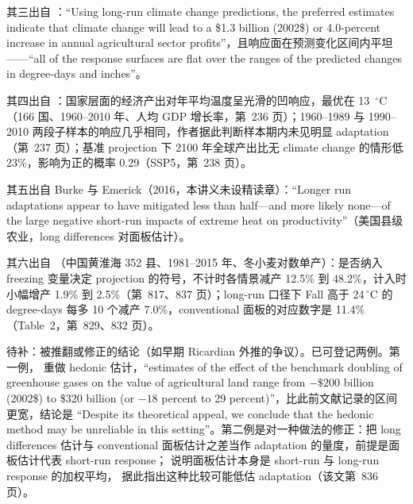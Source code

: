 其三出自 ：``Using long-run climate change predictions, the preferred estimates indicate that climate change will lead to a \$1.3 billion (2002\$) or 4.0-percent increase in annual agricultural sector profits''\citep[第~356 页，AER 97(1) 已刊版口径]{deschenes2007economic}，且响应面在预测变化区间内平坦——``all of the response surfaces are flat over the ranges of the predicted changes in degree-days and inches''\citep[第~355 页]{deschenes2007economic}。

其四出自 ：国家层面的经济产出对年平均温度呈光滑的凹响应，最优在 13~$^\circ$C（166 国、1960--2010 年、人均 GDP 增长率，第~236 页）；1960--1989 与 1990--2010 两段子样本的响应几乎相同，作者据此判断样本期内未见明显 adaptation（第~237 页）；基准 projection 下 2100 年全球产出比无 climate change 的情形低 23\%，影响为正的概率 0.29（SSP5，第~238 页）。

其五出自 Burke 与 Emerick（2016，本讲义未设精读章）：``Longer run adaptations appear to have mitigated less than half—and more likely none—of the large negative short-run impacts of extreme heat on productivity''\citep[第~106 页，摘要]{burke2016adaptation}（美国县级农业，long differences 对面板估计）。

其六出自 （中国黄淮海 352 县、1981--2015 年、冬小麦对数单产）：是否纳入 freezing 变量决定 projection 的符号，不计时各情景减产 12.5\% 到 48.2\%，计入时小幅增产 1.9\% 到 2.5\%（第~817、837 页）；long-run 口径下 Fall 高于 24\,$^\circ$C 的 degree-days 每多 10 个减产 7.0\%，conventional 面板的对应数字是 11.4\%（Table~2，第~829、832 页）。

待补：被推翻或修正的结论（如早期 Ricardian 外推的争议）。已可登记两例。第一例， 重做 hedonic 估计，``estimates of the effect of the benchmark doubling of greenhouse gases on the value of agricultural land range from $-\$200$ billion (2002\$) to \$320 billion (or $-18$ percent to 29 percent)''\citep[第~357 页]{deschenes2007economic}，比此前文献记录的区间更宽，结论是 ``Despite its theoretical appeal, we conclude that the hedonic method may be unreliable in this setting''\citep[第~357 页]{deschenes2007economic}。第二例是对一种做法的修正：把 long differences 估计与 conventional 面板估计之差当作 adaptation 的量度，前提是面板估计代表 short-run response； 说明面板估计本身是 short-run 与 long-run response 的加权平均， 据此指出这种比较可能低估 adaptation（该文第~836 页）。

